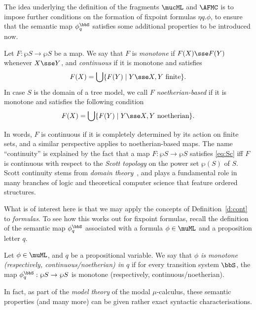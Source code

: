 The idea underlying the definition of the fragments $\mucML$ and $\AFMC$ is to
impose further conditions on the formation of fixpoint formulas $\eta q. \phi$,
to ensure that the semantic map $\phi^{\bbS}_{q}$ satisfies some additional 
properties to be introduced now.

\begin{definition}
\label{d:cont}
Let $F: \wp S \to \wp S$ be a map.
We say that $F$ is \emph{monotone} if $F(X) \sse F(Y)$ whenever $X \sse Y$, and 
\emph{continuous} if it is monotone and satisfies 
\begin{equation}
\label{eq:Sc}
F(X) = \bigcup \{ F(Y) \mid Y \sse X, Y \text{ finite} \}.
\end{equation}
In case $S$ is the domain of a tree model, we call $F$ \emph{noetherian-based}
if it is monotone and satisfies the following 
condition
\begin{equation}
F(X) = \bigcup \{ F(Y) \mid Y \sse X, Y \text{ noetherian} \}.
\end{equation}
\end{definition}

In words, $F$ is continuous if it is completely determined by its action on 
finite sets, and a similar perspective applies to noetherian-based maps.
The name ``continuity'' is explained by the fact that a map $F: \wp S \to \wp S$
satisfies \eqref{eq:Sc} iff $F$ is continuous with respect to the \emph{Scott 
topology} on the power set $\wp(S)$ of $S$.
Scott continuity stems from \emph{domain theory}~\cite{abra94:doma}, and plays a 
fundamental role in many branches of logic and theoretical computer science that
feature ordered structures.

What is of interest here is that we may apply the concepts of 
Definition~\ref{d:cont} to \emph{formulas}.
To see how this works out for fixpoint formulas, recall the definition of the 
semantic map $\phi^{\bbS}_{q}$ associated with a formula $\phi \in \muML$ and a 
proposition letter $q$.

\begin{definition}
Let $\phi \in \muML$, and $q$ be a propositional variable. 
We say that \emph{$\phi$ is monotone (respectively, continuous/noetherian) in
$q$} if for every transition system $\bbS$, the map $\phi^{\bbS}_{q}: \wp S 
\to \wp S$ is monotone (respectively, continuous/noetherian).
\end{definition}

In fact, as part of the \emph{model theory} of the modal $\mu$-calculus, these
semantic properties (and many more) can be given rather exact syntactic 
characterisations.

